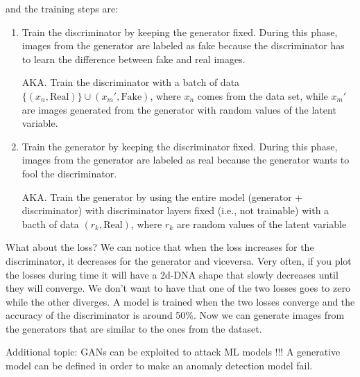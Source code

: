 and the training steps are:
\begin{enumerate}
    \item Train the discriminator by keeping the generator fixed. During this phase, images from the generator are labeled as fake because the discriminator has to learn the difference between fake and real images.
    
    \vspace{0.1cm}
    
    AKA. Train the discriminator with a batch of data $\{(x_{n}, \text{Real})\} \cup {(x_{m}', \text{Fake})}$, where $x_{n}$ comes from the data set, while $x_{m}'$ are images generated from the generator with random values of the latent variable.
    \item Train the generator by keeping the discriminator fixed. During this phase, images from the generator are labeled as real because the generator wants to fool the discriminator.
    
    \vspace{0.1cm}
    
    AKA. Train the generator by using the entire model (generator + discriminator) with discriminator layers fixed (i.e., not trainable) with a bacth of data ${(r_{k}, \text{Real})}$, where $r_{k}$ are random values of the latent variable
\end{enumerate}

What about the loss? We can notice that when the loss increases for the discriminator, it decreases for the generator and viceversa. Very often, if you plot the losses during time it will have a 2d-DNA shape that slowly decreases until they will converge. We don't want to have that one of the two losses goes to zero while the other diverges. A model is trained when the two losses converge and the accuracy of the discriminator is around 50\%. Now we can generate images from the generators that are similar to the ones from the dataset.

Additional topic: GANs can be exploited to attack ML models !!! A generative model can be defined in order to make an anomaly detection model fail.